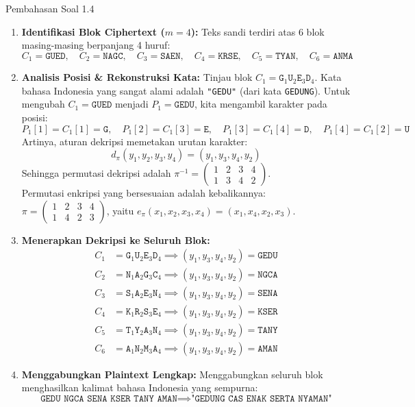 \documentclass[11pt,a4paper]{article}
\begin{document}
\begin{solusibox}{Pembahasan Soal 1.4}
\begin{enumerate}[leftmargin=*]
    \item \textbf{Identifikasi Blok Ciphertext ($m = 4$):}
    Teks sandi terdiri atas 6 blok masing-masing berpanjang 4 huruf:
    \[
    C_1 = \texttt{GUED}, \quad C_2 = \texttt{NAGC}, \quad C_3 = \texttt{SAEN}, \quad C_4 = \texttt{KRSE}, \quad C_5 = \texttt{TYAN}, \quad C_6 = \texttt{ANMA}
    \]
    \item \textbf{Analisis Posisi \& Rekonstruksi Kata:}
    Tinjau blok $C_1 = \texttt{G}_1 \texttt{U}_2 \texttt{E}_3 \texttt{D}_4$. Kata bahasa Indonesia yang sangat alami adalah \texttt{"GEDU"} (dari kata \texttt{GEDUNG}).
    Untuk mengubah $C_1 = \texttt{GUED}$ menjadi $P_1 = \texttt{GEDU}$, kita mengambil karakter pada posisi:
    \[
    P_1[1] = C_1[1] = \texttt{G}, \quad P_1[2] = C_1[3] = \texttt{E}, \quad P_1[3] = C_1[4] = \texttt{D}, \quad P_1[4] = C_1[2] = \texttt{U}
    \]
    Artinya, aturan dekripsi memetakan urutan karakter:
    \[
    d_\pi(y_1, y_2, y_3, y_4) = (y_1, y_3, y_4, y_2)
    \]
    Sehingga permutasi dekripsi adalah $\pi^{-1} = \begin{pmatrix} 1 & 2 & 3 & 4 \\ 1 & 3 & 4 & 2 \end{pmatrix}$.\\
    Permutasi enkripsi yang bersesuaian adalah kebalikannya: $\pi = \begin{pmatrix} 1 & 2 & 3 & 4 \\ 1 & 4 & 2 & 3 \end{pmatrix}$, yaitu $e_\pi(x_1, x_2, x_3, x_4) = (x_1, x_4, x_2, x_3)$.
    \item \textbf{Menerapkan Dekripsi ke Seluruh Blok:}
    \begin{align*}
    C_1 &= \texttt{G}_1 \texttt{U}_2 \texttt{E}_3 \texttt{D}_4 \implies (y_1, y_3, y_4, y_2) = \mathbf{\texttt{GEDU}} \\
    C_2 &= \texttt{N}_1 \texttt{A}_2 \texttt{G}_3 \texttt{C}_4 \implies (y_1, y_3, y_4, y_2) = \mathbf{\texttt{NGCA}} \\
    C_3 &= \texttt{S}_1 \texttt{A}_2 \texttt{E}_3 \texttt{N}_4 \implies (y_1, y_3, y_4, y_2) = \mathbf{\texttt{SENA}} \\
    C_4 &= \texttt{K}_1 \texttt{R}_2 \texttt{S}_3 \texttt{E}_4 \implies (y_1, y_3, y_4, y_2) = \mathbf{\texttt{KSER}} \\
    C_5 &= \texttt{T}_1 \texttt{Y}_2 \texttt{A}_3 \texttt{N}_4 \implies (y_1, y_3, y_4, y_2) = \mathbf{\texttt{TANY}} \\
    C_6 &= \texttt{A}_1 \texttt{N}_2 \texttt{M}_3 \texttt{A}_4 \implies (y_1, y_3, y_4, y_2) = \mathbf{\texttt{AMAN}}
    \end{align*}
    \item \textbf{Menggabungkan Plaintext Lengkap:}
    Menggabungkan seluruh blok menghasilkan kalimat bahasa Indonesia yang sempurna:
    \[
    \texttt{GEDU NGCA SENA KSER TANY AMAN} \implies \mathbf{\texttt{"GEDUNG CAS ENAK SERTA NYAMAN"}}
    \]
\end{enumerate}
\end{solusibox}
\end{document}
